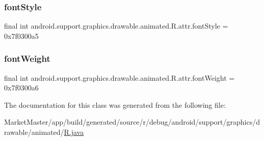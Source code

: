 \subsubsection{\texorpdfstring{font\+Style}{fontStyle}}
{\footnotesize\ttfamily final int android.\+support.\+graphics.\+drawable.\+animated.\+R.\+attr.\+font\+Style = 0x7f0300a5\hspace{0.3cm}{\ttfamily [static]}}

\mbox{\label{classandroid_1_1support_1_1graphics_1_1drawable_1_1animated_1_1R_1_1attr_acf77cf00a4ce91f975f11783754189c1}} 
\subsubsection{\texorpdfstring{font\+Weight}{fontWeight}}
{\footnotesize\ttfamily final int android.\+support.\+graphics.\+drawable.\+animated.\+R.\+attr.\+font\+Weight = 0x7f0300a6\hspace{0.3cm}{\ttfamily [static]}}



The documentation for this class was generated from the following file\+:\begin{DoxyCompactItemize}
\item 
Market\+Master/app/build/generated/source/r/debug/android/support/graphics/drawable/animated/\mbox{\hyperlink{debug_2android_2support_2graphics_2drawable_2animated_2R_8java}{R.\+java}}\end{DoxyCompactItemize}
